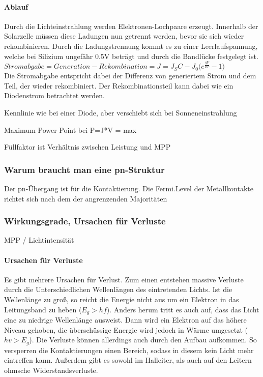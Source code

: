 		\paragraph{Ablauf}
		Durch die Lichteinstrahlung werden Elektronen-Lochpaare erzeugt. Innerhalb der Solarzelle müssen diese Ladungen nun getrennt werden, bevor sie sich wieder rekombinieren. Durch die Ladungstrennung kommt es zu einer Leerlaufspannung, welche bei Silizium ungefähr 0.5V beträgt und durch die Bandlücke festgelegt ist. \\
		$Stromabgabe = Generation - Rekombination = J = J_SC - J_0 \bigg(e^{\frac{qV}{kT}}-1\bigg)$\\
		Die Stromabgabe entspricht dabei der Differenz von generiertem Strom und dem Teil, der wieder rekombiniert. Der Rekombinationsteil kann dabei wie ein Diodenstrom betrachtet werden.
		
		Kennlinie wie bei einer Diode, aber verschiebt sich bei Sonneneinstrahlung
		
		Maximum Power Point bei P=J*V = max
		
		Füllfaktor ist Verhältnis zwischen Leistung und MPP
		

	\subsubsection{Warum braucht man eine pn-Struktur}

		Der pn-Übergang ist für die Kontaktierung. Die Fermi.Level der Metallkontakte richtet sich nach dem der angrenzenden Majoritäten

	\subsubsection{Wirkungsgrade, Ursachen für Verluste}
	
		MPP / Lichtintensität
		
		\paragraph{Ursachen für Verluste} Es gibt mehrere Ursachen für Verlust. Zum einen entstehen massive Verluste durch die Unterschiedlichen Wellenlängen des eintretenden Lichts. Ist die Wellenlänge zu groß, so reicht die Energie nicht aus um ein Elektron in das Leitungsband zu heben ($E_g>hf$). Anders herum tritt es auch auf, dass das Licht eine zu niedrige Wellenlänge ausweist. Dann wird ein Elektron auf das höhere Niveau gehoben, die überschüssige Energie wird jedoch in Wärme umgesetzt ($hv > E_g$). Die Verluste können allerdings auch durch den Aufbau aufkommen. So versperren die Kontaktierungen einen Bereich, sodass in diesem kein Licht mehr eintreffen kann. Außerdem gibt es sowohl im Halleiter, als auch auf den Leitern ohmsche Widerstandsverluste.
	

